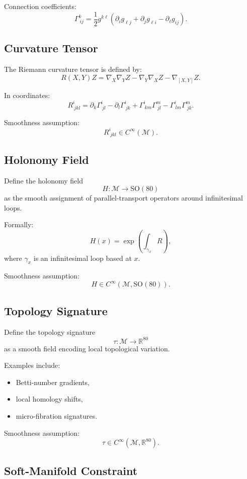 Connection coefficients:
\[
\Gamma^k_{\ ij}
= \frac{1}{2} g^{k\ell}
\left(
\partial_i g_{\ell j}
+ \partial_j g_{\ell i}
- \partial_\ell g_{ij}
\right).
\]

\subsection{Curvature Tensor}

The Riemann curvature tensor is defined by:
\[
R(X,Y)Z = \nabla_X \nabla_Y Z - \nabla_Y \nabla_X Z - \nabla_{[X,Y]} Z.
\]

In coordinates:
\[
R^i_{\ jkl}
= \partial_k \Gamma^i_{\ jl}
- \partial_l \Gamma^i_{\ jk}
+ \Gamma^i_{\ km}\Gamma^m_{\ jl}
- \Gamma^i_{\ lm}\Gamma^m_{\ jk}.
\]

Smoothness assumption:
\[
R^i_{\ jkl} \in C^\infty(\mathcal{M}).
\]

\subsection{Holonomy Field}

Define the holonomy field
\[
H : \mathcal{M} \to \mathrm{SO}(80)
\]
as the smooth assignment of parallel-transport operators around infinitesimal
loops.

Formally:
\[
H(x) = \exp\!\left( \int_{\gamma_x} R \right),
\]
where $\gamma_x$ is an infinitesimal loop based at $x$.

Smoothness assumption:
\[
H \in C^\infty(\mathcal{M}, \mathrm{SO}(80)).
\]

\subsection{Topology Signature}

Define the topology signature
\[
\tau : \mathcal{M} \to \mathbb{R}^{80}
\]
as a smooth field encoding local topological variation.

Examples include:
\begin{itemize}
    \item Betti-number gradients,
    \item local homology shifts,
    \item micro-fibration signatures.
\end{itemize}

Smoothness assumption:
\[
\tau \in C^\infty(\mathcal{M}, \mathbb{R}^{80}).
\]

\subsection{Soft-Manifold Constraint}

